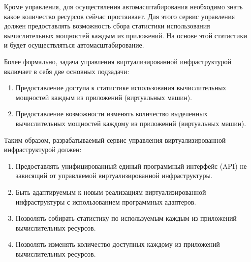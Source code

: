 Кроме управления, для осуществления автомасштабирования необходимо знать какое количество ресурсов сейчас простаивает.
Для этого сервис управления должен предоставлять возможность сбора статистики использования вычислительных мощностей каждым из приложений.
На основе этой статистики и будет осуществляться автомасштабирование.

Более формально, задача управления виртуализированной инфраструктурой включает в себя две основных подзадачи:
\begin{enumerate}
    \item Предоставление доступа к статистике использования вычислительных мощностей каждым из приложений (виртуальных машин).
    \item Предоставление возможности изменять количество выделенных вычислительных мощностей каждому из приложений (виртуальных машин).
\end{enumerate}

Таким образом, разрабатываемый сервис управления виртуализированной инфраструктурой должен:
\begin{enumerate}
    \item Предоставлять унифицированный единый программный интерфейс (API) не зависящий от управляемой виртуализированной инфраструктуры.
    \item Быть адаптируемым к новым реализациям виртуализированной инфраструктуры с использованием программных адаптеров.
    \item Позволять собирать статистику по используемым каждым из приложений вычислительных ресурсов.
    \item Позволять изменять количество доступных каждому из приложений вычислительных ресурсов.
\end{enumerate}

